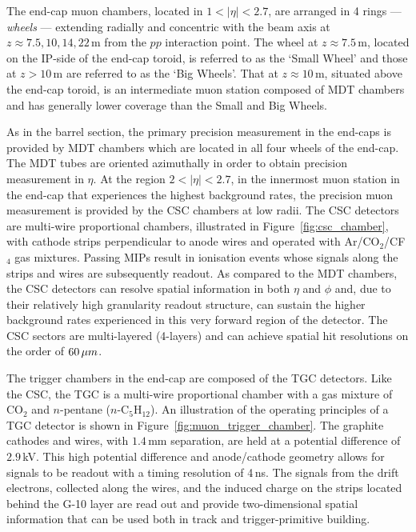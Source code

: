 The end-cap muon chambers, located in $1 < \lvert \eta \rvert < 2.7$, are arranged
in 4 rings --- \textit{wheels} ---  extending radially and concentric with the beam axis at $z \approx 7.5, 10, 14, 22$\,m
from the $pp$ interaction point.
The wheel at $z\approx 7.5$\,m, located on the IP-side of the end-cap toroid, is referred to as the `Small Wheel' and those at $z>10$\,m are
referred to as the `Big Wheels'.
That at $z\approx 10$\,m, situated above the end-cap toroid, is an intermediate muon station composed of MDT chambers and has generally lower coverage than the
Small and Big Wheels.

As in the barrel section, the primary precision measurement in the end-caps is provided
by MDT chambers which are located in all four wheels of the end-cap.
The MDT tubes are oriented azimuthally in order to obtain precision measurement in $\eta$.
At the region $2 < \lvert \eta \rvert < 2.7$, in the innermost muon station
in the end-cap that experiences the highest background rates,
the precision muon measurement is provided by the CSC chambers at low radii.
The CSC detectors are multi-wire proportional chambers, illustrated in Figure~\ref{fig:csc_chamber},
with cathode strips perpendicular to anode wires and operated with Ar/CO$_2$/CF$_4$ gas mixtures.
Passing MIPs result in ionisation events whose signals along the strips and wires are
subsequently readout.
As compared to the MDT chambers, the CSC detectors can resolve spatial information in both $\eta$ and $\phi$
and, due to their relatively high granularity readout structure, can sustain the higher
background rates experienced in this very forward region of the detector.
The CSC sectors are multi-layered (4-layers) and can achieve spatial hit resolutions on the order
of $60\,\mu m$.

The trigger chambers in the end-cap are composed of the TGC detectors.
Like the CSC, the TGC is a multi-wire proportional chamber with a gas mixture
of CO$_2$ and $n$-pentane ($n$-C$_5$H$_{12}$).
An illustration of the operating principles of a TGC detector is shown in Figure~\ref{fig:muon_trigger_chamber}.
The graphite cathodes and wires, with $1.4$\,mm separation, are held at a potential
difference of $2.9$\,kV.
This high potential difference and anode/cathode geometry allows for signals to be readout
with a timing resolution of 4\,ns.
The signals from the drift electrons, collected along the wires, and the induced
charge on the strips located behind the G-10 layer are read out and provide
two-dimensional spatial information that can be used both in track and trigger-primitive building.


